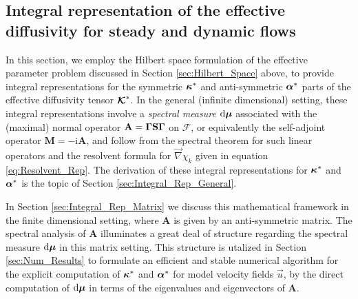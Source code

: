 \documentclass[11pt]{amsart}
\newcommand{\I}{\mathrm{i}}
\renewcommand{\d}{\mathrm{d}}
\newcommand{\Mb}{\mathbf{M}}
\newcommand{\Sb}{\mathbf{S}}
\newcommand{\Ab}{\mathbf{A}}
\newcommand\Kbc{\mbox{\boldmath${\mathcal{K}}$}}
\newcommand{\Fs}{\mathscr{F}}
\newcommand\bmu{\mbox{\boldmath${\mu}$}}
\newcommand\balpha{\mbox{\boldmath${\alpha}$}}
\newcommand\bkappa{\mbox{\boldmath${\kappa}$}}
\newcommand\bGamma{\mbox{\boldmath${\Gamma}$}}
\begin{document}
\subsection{Integral representation of the effective diffusivity
  for steady and dynamic flows}\label{sec:Integral_Rep}
%
In this section, we employ the Hilbert space formulation of the
effective parameter problem discussed in Section
\ref{sec:Hilbert_Space} above, to provide integral representations for the
symmetric $\bkappa^*$ and anti-symmetric $\balpha^*$ parts of the
effective diffusivity tensor $\Kbc^*$. In the general (infinite
dimensional) setting, these integral representations involve a
\emph{spectral measure} $\d\bmu$ associated with the (maximal) normal
operator $\Ab=\bGamma\Sb\bGamma$ on $\Fs$, or equivalently the
self-adjoint operator $\Mb=-\I\Ab$, and follow from the spectral
theorem for such linear operators \cite{Reed-1980,Stone:64} and the resolvent
formula for $\vec{\nabla}\chi_k$ given in equation
\eqref{eq:Resolvent_Rep}. The derivation of these integral
representations for $\bkappa^*$ and $\balpha^*$ is the topic of
Section \ref{sec:Integral_Rep_General}.




In Section \ref{sec:Integral_Rep_Matrix} we discuss this mathematical
framework in the finite dimensional setting, where $\Ab$ is given by
an anti-symmetric matrix. The spectral analysis of $\Ab$ illuminates a
great deal of structure regarding the spectral measure $\d\bmu$ in
this matrix setting. This structure is utalized in Section
\ref{sec:Num_Results} to formulate an efficient and stable numerical
algorithm for the explicit computation of $\bkappa^*$ and $\balpha^*$
for model velocity fields $\vec{u}$, by the direct computation of
$\d\bmu$ in terms of the eigenvalues and eigenvectors of $\Ab$.   
\end{document}
